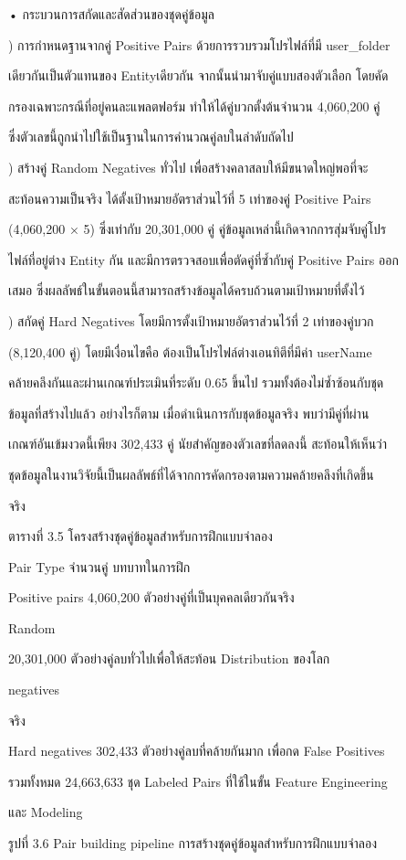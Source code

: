\documentclass[12pt,a4paper]{report}
\begin{document}
\noindent • กระบวนการสกัดและสัดส่วนของชุดคู่ข้อมูล\par
{}) การกำหนดฐานจากคู่ Positive Pairs ด้วยการรวบรวมโปรไฟล์ที่มี user\_folder\par
เดียวกันเป็นตัวแทนของ Entityเดียวกัน จากนั้นนำมาจับคู่แบบสองตัวเลือก โดยคัด\par
กรองเฉพาะกรณีที่อยู่คนละแพลตฟอร์ม ทำให้ได้คู่บวกตั้งต้นจำนวน 4,060,200 คู่\par
ซึ่งตัวเลขนี้ถูกนำไปใช้เป็นฐานในการคำนวณคู่ลบในลำดับถัดไป\par
{}) สร้างคู่ Random Negatives ทั่วไป เพื่อสร้างคลาสลบให้มีขนาดใหญ่พอที่จะ\par
สะท้อนความเป็นจริง ได้ตั้งเป้าหมายอัตราส่วนไว้ที่ 5 เท่าของคู่ Positive Pairs\par
(4,060,200 × 5) ซึ่งเท่ากับ 20,301,000 คู่ คู่ข้อมูลเหล่านี้เกิดจากการสุ่มจับคู่โปร\par
ไฟล์ที่อยู่ต่าง Entity กัน และมีการตรวจสอบเพื่อตัดคู่ที่ซ้ำกับคู่ Positive Pairs ออก\par
เสมอ ซึ่งผลลัพธ์ในขั้นตอนนี้สามารถสร้างข้อมูลได้ครบถ้วนตามเป้าหมายที่ตั้งไว้\par
{}) สกัดคู่ Hard Negatives โดยมีการตั้งเป้าหมายอัตราส่วนไว้ที่ 2 เท่าของคู่บวก\par
(8,120,400 คู่) โดยมีเงื่อนไขคือ ต้องเป็นโปรไฟล์ต่างเอนทิตีที่มีค่า userName\par
คล้ายคลึงกันและผ่านเกณฑ์ประเมินที่ระดับ 0.65 ขึ้นไป รวมทั้งต้องไม่ซ้ำซ้อนกับชุด\par
ข้อมูลที่สร้างไปแล้ว อย่างไรก็ตาม เมื่อดำเนินการกับชุดข้อมูลจริง พบว่ามีคู่ที่ผ่าน\par
เกณฑ์อันเข้มงวดนี้เพียง 302,433 คู่ นัยสำคัญของตัวเลขที่ลดลงนี้ สะท้อนให้เห็นว่า\par
\clearpage
ชุดข้อมูลในงานวิจัยนี้เป็นผลลัพธ์ที่ได้จากการคัดกรองตามความคล้ายคลึงที่เกิดขึ้น\par
จริง\par
\begin{center}\small ตารางที่ 3.5 โครงสร้างชุดคู่ข้อมูลสำหรับการฝึกแบบจำลอง\end{center}
Pair Type จำนวนคู่ บทบาทในการฝึก\par
Positive pairs 4,060,200 ตัวอย่างคู่ที่เป็นบุคคลเดียวกันจริง\par
Random\par
20,301,000 ตัวอย่างคู่ลบทั่วไปเพื่อให้สะท้อน Distribution ของโลก\par
negatives\par
จริง\par
Hard negatives 302,433 ตัวอย่างคู่ลบที่คล้ายกันมาก เพื่อกด False Positives\par
รวมทั้งหมด 24,663,633 ชุด Labeled Pairs ที่ใช้ในขั้น Feature Engineering\par
และ Modeling\par
\clearpage
\begin{center}\small รูปที่ 3.6 Pair building pipeline การสร้างชุดคู่ข้อมูลสำหรับการฝึกแบบจำลอง\end{center}
\end{document}
